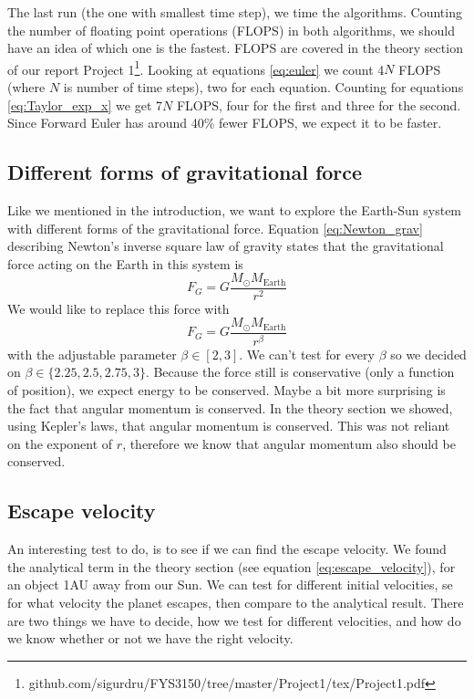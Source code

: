 \documentclass[reprint, english,notitlepage,nofootinbib]{revtex4-1}  %
\begin{document}
The last run (the one with smallest time step), we time the algorithms. Counting the number of floating point operations (FLOPS) in both algorithms, we should have an idea of which one is the fastest. FLOPS are covered in the theory section of our report Project 1\footnote{github.com/sigurdru/FYS3150/tree/master/Project1/tex/Project1.pdf}. Looking at equations \eqref{eq:euler} we count 4$N$ FLOPS (where $N$ is number of time steps), two for each equation. Counting for equations \eqref{eq:Taylor_exp_x} we get 7$N$ FLOPS, four for the first and three for the second. Since Forward Euler has around 40\% fewer FLOPS, we expect it to be faster.

\subsection{Different forms of gravitational force}

Like we mentioned in the introduction, we want to explore the Earth-Sun system with different forms of the gravitational force. Equation \eqref{eq:Newton_grav} describing Newton's inverse square law of gravity states that the gravitational force acting on the Earth in this system is
\begin{equation*}
  F_G = G \frac{M_\odot M_{\text{Earth}}}{r^2}
\end{equation*}
We would like to replace this force with
\begin{equation}
  F_G = G \frac{M_\odot M_{\text{Earth}}}{r^\beta}
  \label{eq:Newton_grav_beta}
\end{equation}
with the adjustable parameter $\beta \in [2, 3]$. We can't test for every $\beta$ so we decided on $\beta \in \{2.25,2.5,2.75,3\}$. Because the force still is conservative (only a function of position), we expect energy to be conserved. Maybe a bit more surprising is the fact that angular momentum is conserved. In the theory section we showed, using Kepler's laws, that angular momentum is conserved. This was not reliant on the exponent of $r$, therefore we know that angular momentum also should be conserved.

\subsection{Escape velocity}

An interesting test to do, is to see if we can find the escape velocity. We found the analytical term in the theory section (see equation \eqref{eq:escape_velocity}), for an object 1AU away from our Sun. We can test for different initial velocities, se for what velocity the planet escapes, then compare to the analytical result. There are two things we have to decide, how we test for different velocities, and how do we know whether or not we have the right velocity.
\end{document}
